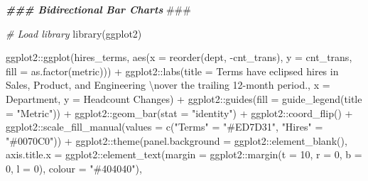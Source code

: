 \documentclass[
]{book}
\newenvironment{Shaded}{\begin{snugshade}}{\end{snugshade}}
\newcommand{\AlertTok}[1]{\textcolor[rgb]{0.94,0.16,0.16}{#1}}
\newcommand{\AttributeTok}[1]{\textcolor[rgb]{0.77,0.63,0.00}{#1}}
\newcommand{\CommentTok}[1]{\textcolor[rgb]{0.56,0.35,0.01}{\textit{#1}}}
\newcommand{\DecValTok}[1]{\textcolor[rgb]{0.00,0.00,0.81}{#1}}
\newcommand{\DocumentationTok}[1]{\textcolor[rgb]{0.56,0.35,0.01}{\textbf{\textit{#1}}}}
\newcommand{\FunctionTok}[1]{\textcolor[rgb]{0.00,0.00,0.00}{#1}}
\newcommand{\NormalTok}[1]{#1}
\newcommand{\OtherTok}[1]{\textcolor[rgb]{0.56,0.35,0.01}{#1}}
\newcommand{\SpecialCharTok}[1]{\textcolor[rgb]{0.00,0.00,0.00}{#1}}
\newcommand{\StringTok}[1]{\textcolor[rgb]{0.31,0.60,0.02}{#1}}
\begin{document}
\begin{Shaded}
\begin{Highlighting}[]
\DocumentationTok{\#\#\# Bidirectional Bar Charts }\AlertTok{\#\#\#}

\CommentTok{\# Load library}
\FunctionTok{library}\NormalTok{(ggplot2)}

\NormalTok{ggplot2}\SpecialCharTok{::}\FunctionTok{ggplot}\NormalTok{(hires\_terms, }\FunctionTok{aes}\NormalTok{(}\AttributeTok{x =} \FunctionTok{reorder}\NormalTok{(dept, }\SpecialCharTok{{-}}\NormalTok{cnt\_trans), }\AttributeTok{y =}\NormalTok{ cnt\_trans, }\AttributeTok{fill =} \FunctionTok{as.factor}\NormalTok{(metric))) }\SpecialCharTok{+}
\NormalTok{ggplot2}\SpecialCharTok{::}\FunctionTok{labs}\NormalTok{(}\AttributeTok{title =} \StringTok{\textquotesingle{}Terms have eclipsed hires in Sales, Product, and Engineering }\SpecialCharTok{\textbackslash{}n}\StringTok{over the trailing 12{-}month period.\textquotesingle{}}\NormalTok{, }\AttributeTok{x =} \StringTok{\textquotesingle{}Department\textquotesingle{}}\NormalTok{, }\AttributeTok{y =} \StringTok{\textquotesingle{}Headcount Changes\textquotesingle{}}\NormalTok{) }\SpecialCharTok{+}
\NormalTok{ggplot2}\SpecialCharTok{::}\FunctionTok{guides}\NormalTok{(}\AttributeTok{fill =} \FunctionTok{guide\_legend}\NormalTok{(}\AttributeTok{title =} \StringTok{"Metric"}\NormalTok{)) }\SpecialCharTok{+}
\NormalTok{ggplot2}\SpecialCharTok{::}\FunctionTok{geom\_bar}\NormalTok{(}\AttributeTok{stat =} \StringTok{"identity"}\NormalTok{) }\SpecialCharTok{+}
\NormalTok{ggplot2}\SpecialCharTok{::}\FunctionTok{coord\_flip}\NormalTok{() }\SpecialCharTok{+}
\NormalTok{ggplot2}\SpecialCharTok{::}\FunctionTok{scale\_fill\_manual}\NormalTok{(}\AttributeTok{values =} \FunctionTok{c}\NormalTok{(}\StringTok{"Terms"} \OtherTok{=} \StringTok{"\#ED7D31"}\NormalTok{,}
                                      \StringTok{"Hires"} \OtherTok{=} \StringTok{"\#0070C0"}\NormalTok{)) }\SpecialCharTok{+}
\NormalTok{ggplot2}\SpecialCharTok{::}\FunctionTok{theme}\NormalTok{(}\AttributeTok{panel.background =}\NormalTok{ ggplot2}\SpecialCharTok{::}\FunctionTok{element\_blank}\NormalTok{(),}
               \AttributeTok{axis.title.x =}\NormalTok{ ggplot2}\SpecialCharTok{::}\FunctionTok{element\_text}\NormalTok{(}\AttributeTok{margin =}\NormalTok{ ggplot2}\SpecialCharTok{::}\FunctionTok{margin}\NormalTok{(}\AttributeTok{t =} \DecValTok{10}\NormalTok{, }\AttributeTok{r =} \DecValTok{0}\NormalTok{, }\AttributeTok{b =} \DecValTok{0}\NormalTok{, }\AttributeTok{l =} \DecValTok{0}\NormalTok{), }\AttributeTok{colour =} \StringTok{"\#404040"}\NormalTok{),}

\end{Highlighting}
\end{Shaded}
\end{document}
